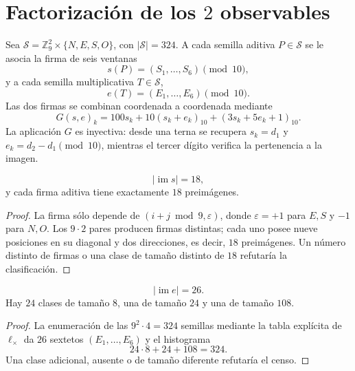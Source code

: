 \section{Factorización de los \(2\) observables}

Sea \(\mathcal S=\mathbb Z_9^2\times\{N,E,S,O\}\), con
\(|\mathcal S|=324\). A cada semilla aditiva \(P\in\mathcal S\) se le
asocia la firma de seis ventanas
\[
s(P)=(S_1,\ldots,S_6)\pmod{10},
\]
y a cada semilla multiplicativa \(T\in\mathcal S\),
\[
e(T)=(E_1,\ldots,E_6)\pmod{10}.
\]
Las dos firmas se combinan coordenada a coordenada mediante
\[
G(s,e)_k=
100s_k+10(s_k+e_k)_{10}+(3s_k+5e_k+1)_{10}.
\]
La aplicación \(G\) es inyectiva: desde una terna se recupera
\(s_k=d_1\) y \(e_k=d_2-d_1\pmod{10}\), mientras el tercer dígito verifica
la pertenencia a la imagen.

\begin{lemma}
\label{pf84:E02-18}
\[
 |\operatorname{im}s|=18,
\]
y cada firma aditiva tiene exactamente \(18\) preimágenes.
\end{lemma}
\begin{proof}
La firma sólo depende de
\((i+j\bmod9,\varepsilon)\), donde \(\varepsilon=+1\) para \(E,S\) y
\(-1\) para \(N,O\). Los \(9\cdot2\) pares producen firmas distintas; cada
uno posee nueve posiciones en su diagonal y dos direcciones, es decir,
\(18\) preimágenes. Un número distinto de firmas o una clase de tamaño
distinto de \(18\) refutaría la clasificación.
\end{proof}

\begin{lemma}
\label{pf84:E02-19}
\[
 |\operatorname{im}e|=26.
\]
Hay \(24\) clases de tamaño \(8\), una de tamaño \(24\) y una de tamaño
\(108\).
\end{lemma}
\begin{proof}
La enumeración de las \(9^2\cdot4=324\) semillas mediante la tabla explícita
de \(\ell_\times\) da \(26\) sextetos
\((E_1,\ldots,E_6)\) y el histograma
\[
 24\cdot8+24+108=324.
\]
Una clase adicional, ausente o de tamaño diferente refutaría el censo.
\end{proof}

